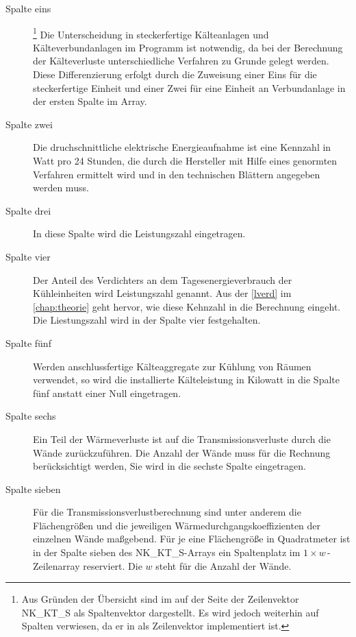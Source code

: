 \begin{description}

	\item [Spalte eins]\footnote{ Aus Gr\"unden der \"Ubersicht sind im
	 auf der Seite \pageref{fridge} der Zeilenvektor
	NK\_KT\_S als Spaltenvektor dargestellt. Es wird jedoch weiterhin auf
	Spalten verwiesen, da er in \matlab als Zeilenvektor implementiert
	ist.} Die Unterscheidung in steckerfertige Kälteanlagen und
	Kälteverbundanlagen im Programm ist notwendig, da bei der Berechnung der
	Kälteverluste unterschiedliche Verfahren zu Grunde gelegt werden.  Diese
	Differenzierung erfolgt durch die Zuweisung einer Eins für die
	steckerfertige Einheit und einer Zwei für eine Einheit an Verbundanlage
	in der ersten Spalte im Array.

	\item [{Spalte zwei}] Die druchschnittliche elektrische Energieaufnahme
	ist eine Kennzahl in Watt pro 24 Stunden, die durch die Hersteller mit
	Hilfe eines genormten Verfahren ermittelt wird und in den technischen
	Blättern angegeben werden muss.

	\item [{Spalte drei}] In diese Spalte wird die Leistungszahl
	eingetragen.

	\item [{Spalte vier}] Der Anteil des Verdichters an dem
	Tagesenergieverbrauch der Kühleinheiten wird Leistungszahl genannt. Aus
	der \cref{lverd} im \cref{chap:theorie} geht hervor, wie diese Kehnzahl
	in die Berechnung eingeht. Die Liestungszahl wird in der Spalte vier
	festgehalten.

	\item [{Spalte fünf}] Werden anschlussfertige Kälteaggregate zur Kühlung
	von Räumen verwendet, so wird die installierte Kälteleistung in Kilowatt
	in die Spalte fünf anstatt einer Null eingetragen.

	\item [{Spalte sechs}] Ein Teil der Wärmeverluste ist auf die
	Transmissionsverluste durch die Wände zurückzuführen.  Die Anzahl der
	Wände muss für die Rechnung berücksichtigt werden, Sie wird in die
	sechste Spalte eingetragen.
	
	\item [{Spalte sieben}] Für die Transmissionsverlustberechnung sind
	unter anderem die Flächengrößen und die jeweiligen
	Wärmedurchgangskoeffizienten der einzelnen Wände
	maßgebend. Für je
	eine Flächengröße in Quadratmeter ist in der Spalte sieben des
	NK\_KT\_S-Arrays ein Spaltenplatz im $1\times w\,$-Zeilenarray
	reserviert. Die $w$ steht für die Anzahl der Wände.


\end{description}
